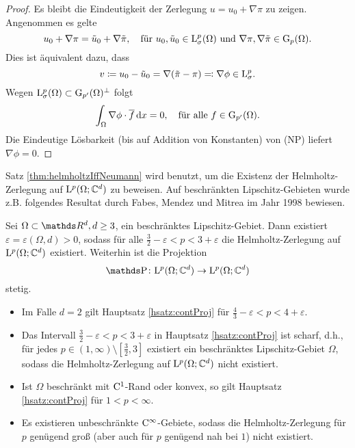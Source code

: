 \begin{proof}
  Es bleibt die Eindeutigkeit der Zerlegung $u = u_0 + \nabla \pi$ zu zeigen.
  Angenommen es gelte
  $$
  u_0 + \nabla \pi = \tilde u_0 + \nabla \tilde \pi, \quad\text{für }
  u_0,\tilde u_0 \in \mathrm{L}_\sigma^p(\Omega) \text{ und } \nabla \pi, \nabla \tilde \pi \in \mathrm{G}_p(\Omega).
  $$
  Dies ist äquivalent dazu, dass 
  $$
  v \coloneqq u_0 - \tilde u_0 = \nabla( \tilde \pi - \pi) \eqqcolon \nabla \phi \in \mathrm{L}_\sigma^p.
  $$
  Wegen $\mathrm{L}_\sigma^p(\Omega) \subset \mathrm{G}_{p'}(\Omega)^\perp$ folgt
  $$
  \int_\Omega \nabla \phi \cdot \overline f \, {\operatorname{d}\!{x}} = 0, \quad\text{für alle } f \in \mathrm{G}_{p'}(\Omega).
  $$
  Die Eindeutige Lösbarkeit (bis auf Addition von Konstanten) von (NP) liefert $\nabla\phi = 0$.
\end{proof}

Satz \ref{thm:helmholtzIffNeumann} wird benutzt, um die Existenz der Helmholtz-Zerlegung auf $\mathrm{L}^p(\Omega; \mathbb{C}^d)$ zu beweisen.
Auf beschränkten Lipschitz-Gebieten wurde z.B. folgendes Resultat durch Fabes, Mendez und Mitrea im Jahr 1998 \cite{fabes} bewiesen.

\begin{hsatz}
  \label{hsatz:contProj}
  Sei $\Omega \subset \R^d, d \geq 3$, ein beschränktes Lipschitz-Gebiet.
  Dann existiert $\varepsilon = \varepsilon(\Omega, d) > 0$, sodass für alle $\frac{3}{2} - \varepsilon < p < 3 + \varepsilon$ die Helmholtz-Zerlegung auf $\mathrm{L}^p(\Omega; \mathbb{C}^d)$ existiert.
  Weiterhin ist die Projektion
  $$
  \PP \colon \Ell^p(\Omega; \C^d) \to \Ell^p(\Omega; \C^d)
  $$
  stetig.
\end{hsatz}

\begin{rem}
  \begin{itemize}
    \item Im Falle $d = 2$ gilt Hauptsatz \ref{hsatz:contProj} für $\frac{4}{3} - \varepsilon < p < 4 + \varepsilon$.
    \item Das Intervall $\frac{3}{2} - \varepsilon < p < 3 + \varepsilon$ in Hauptsatz \ref{hsatz:contProj} ist scharf, d.h., für jedes $p \in (1,\infty) \setminus [\frac{3}{2}, 3]$ existiert ein beschränktes Lipschitz-Gebiet $\Omega$, sodass die Helmholtz-Zerlegung auf $\mathrm{L}^p(\Omega; \mathbb{C}^d)$ nicht existiert.
    \item Ist $\Omega$ beschränkt mit $\mathrm{C}^1$-Rand oder konvex, so gilt Hauptsatz \ref{hsatz:contProj} für $1 < p < \infty$.
    \item Es existieren unbeschränkte $\mathrm{C}^\infty$-Gebiete, sodass die Helmholtz-Zerlegung für $p$ genügend groß (aber auch für $p$ genügend nah bei $1$) nicht existiert.
  \end{itemize}
\end{rem}

